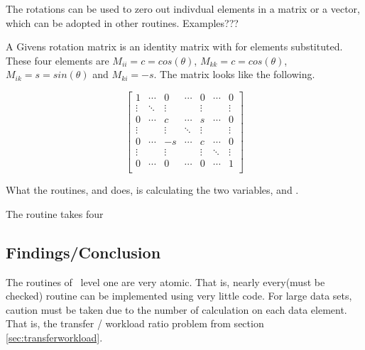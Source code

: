 The rotations can be used to zero out indivdual elements in a matrix
or a vector, which can be adopted in other routines. Examples???

A Givens rotation matrix is an identity matrix with for elements
substituted. These four elements are $M_{ii} = c = cos(\theta)$,
$M_{kk} = c = cos(\theta)$, $M_{ik} = s = sin(\theta)$ and $M_{ki} =
-s$. The matrix looks like the following.

\[\left[
\begin{array}{ccccccc}
1      & \cdots & 0      & \cdots & 0      & \cdots & 0 \\
\vdots & \ddots & \vdots &        & \vdots &        & \vdots \\
0      & \cdots & c      & \cdots & s      & \cdots & 0 \\
\vdots &        & \vdots & \ddots & \vdots &        & \vdots \\
0      & \cdots & -s     & \cdots & c      & \cdots & 0 \\
\vdots &        & \vdots &        & \vdots & \ddots & \vdots \\
0      & \cdots & 0      & \cdots & 0      & \cdots & 1 \\
\end{array}
\right]\]

What the routines,  and  does, is
calculating the two variables,  and .

The routine  takes four 


\subsection{Findings/Conclusion}

The routines of \BLAS\ level one are very atomic. That is, nearly
every(must be checked) routine can be implemented using very little
code. For large data sets, caution must be taken due to the number of
calculation on each data element. That is, the transfer / workload
ratio problem from section \ref{sec:transferworkload}.


